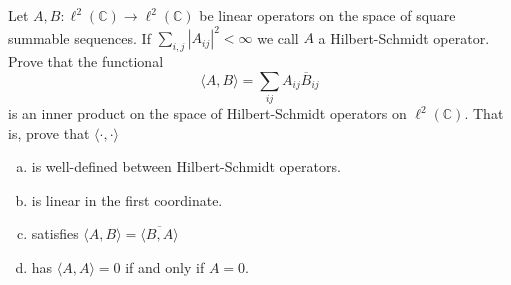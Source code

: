 \documentclass[12pt,letterpaper,cm]{hmcpset}
\begin{document}
\begin{problem}[4]
    Let $A,B : \ell^2(\mathbb{C}) \to \ell^2(\mathbb{C})$ be linear operators on the space of square
    summable sequences. If $\sum_{i,j} |A_{ij}|^2 < \infty$ we call $A$ a Hilbert-Schmidt operator.
    Prove that the functional
    \[
        \langle A,B\rangle = \sum_{ij}A_{ij}\overline B_{ij}
    \]
    is an inner product on the space of Hilbert-Schmidt operators on $\ell^2(\mathbb{C})$.
    That is, prove that $\langle \cdot,\cdot\rangle$
\begin{enumerate}[(a)]
    \item is well-defined between Hilbert-Schmidt operators.
    \item is linear in the first coordinate.
    \item satisfies $\langle A,B\rangle = \overline{\langle B,A\rangle}$
    \item has $\langle A,A\rangle = 0$ if and only if $A=0$.
\end{enumerate}
\end{problem}

\begin{solution}
    \vfill
\end{solution}
\clearpage
\end{document}
